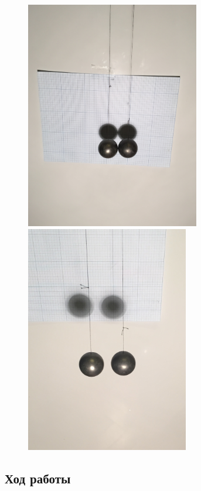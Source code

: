\documentclass[a4paper, 12pt]{article}
\begin{document}
\begin{figure}[h]
\begin{center}
\begin{minipage}[h]{0.45 \linewidth}
\includegraphics[height=10cm]{3}
\end{minipage}
\hfill 
\begin{minipage}[h]{0.45 \linewidth}
\includegraphics[height=10cm]{5}
\end{minipage}
\end{center}
\end{figure}


\subsection*{Ход работы}
\end{document}
